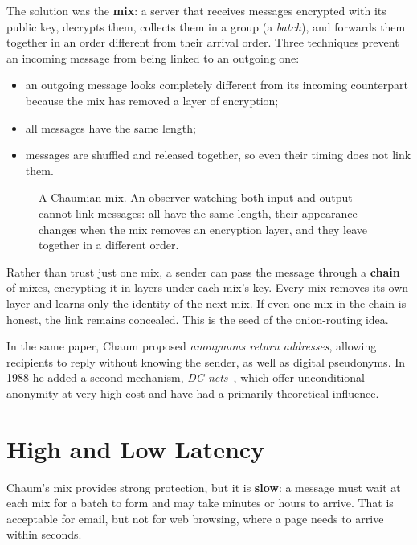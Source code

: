 The solution was the \textbf{mix}: a server that receives messages encrypted with its public key, decrypts them, collects them in a group (a \emph{batch}), and forwards them together in an order different from their arrival order. Three techniques prevent an incoming message from being linked to an outgoing one:
\begin{itemize}
  \item an outgoing message looks completely different from its incoming counterpart because the mix has removed a layer of encryption;
  \item all messages have the same length;
  \item messages are shuffled and released together, so even their timing does not link them.
\end{itemize}
\begin{figure}[htbp]
\centering

\caption{A Chaumian mix. An observer watching both input and output cannot link messages: all have the same length, their appearance changes when the mix removes an encryption layer, and they leave together in a different order.}
\label{fig:mix}
\end{figure}

Rather than trust just one mix, a sender can pass the message through a \textbf{chain} of mixes, encrypting it in layers under each mix's key. Every mix removes its own layer and learns only the identity of the next mix. If even one mix in the chain is honest, the link remains concealed. This is the seed of the onion-routing idea.

In the same paper, Chaum proposed \emph{anonymous return addresses}, allowing recipients to reply without knowing the sender, as well as digital pseudonyms. In 1988 he added a second mechanism, \emph{DC-nets}~\cite{chaum1988dining}, which offer unconditional anonymity at very high cost and have had a primarily theoretical influence.

\section{High and Low Latency}\label{sec:radici-latenza}

Chaum's mix provides strong protection, but it is \textbf{slow}: a message must wait at each mix for a batch to form and may take minutes or hours to arrive. That is acceptable for email, but not for web browsing, where a page needs to arrive within seconds.

